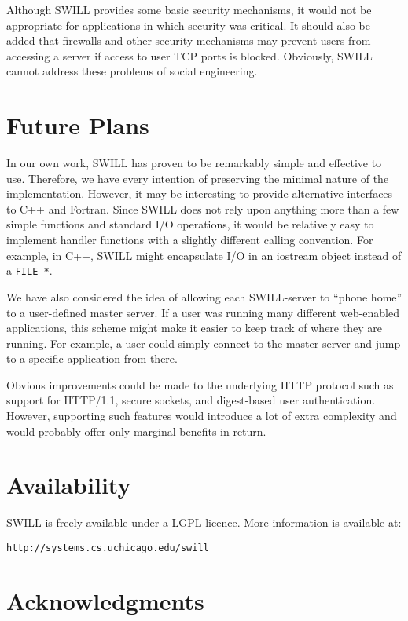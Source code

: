 Although SWILL provides some basic security mechanisms, it would not
be appropriate for applications in which security was critical.  It
should also be added that firewalls and other security mechanisms may
prevent users from accessing a server if access to user TCP ports is
blocked.  Obviously, SWILL cannot address these problems of social
engineering.

\section{Future Plans}

In our own work, SWILL has proven to be remarkably simple and
effective to use.  Therefore, we have every intention of preserving the minimal
nature of the implementation.   However, it may be interesting to provide
alternative interfaces to C++ and Fortran.  Since SWILL does
not rely upon anything more than a few simple functions and standard I/O operations,
it would be relatively easy to implement handler functions with a slightly
different calling convention.  For example, in C++, SWILL might encapsulate I/O
in an iostream object instead of a {\tt FILE *}.

We have also considered the idea of allowing each SWILL-server to
``phone home'' to a user-defined master server.  If a user was running
many different web-enabled applications, this scheme might make it
easier to keep track of where they are running.  For example, a user
could simply connect to the master server and jump to a specific
application from there.

Obvious improvements could be made to the underlying HTTP protocol such as support
for HTTP/1.1, secure sockets, and digest-based user authentication.  However,
supporting such features would introduce a lot of extra complexity and would probably
offer only marginal benefits in return.

\section{Availability}

SWILL is freely available under a LGPL licence.  More information is available at:

\begin{center}
{\tt http://systems.cs.uchicago.edu/swill}
\end{center}

\section{Acknowledgments}

